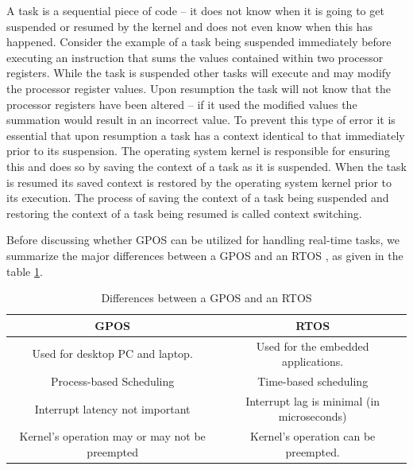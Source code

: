 \documentclass[12pt]{report}
\begin{document}
\begin{itemize}
     A task is a sequential piece of code – it does not know when it is going to get suspended or resumed by the kernel and does not even know when this has happened. Consider the example of a task being suspended immediately before executing an instruction that sums the values contained within two processor registers. While the task is suspended other tasks will execute and may modify the processor register values. Upon resumption the task will not know that the processor registers have been altered – if it used the modified values the summation would result in an incorrect value. To prevent this type of error it is essential that upon resumption a task has a context identical to that immediately prior to its suspension. The operating system kernel is responsible for ensuring this and does so by saving the context of a task as it is suspended. When the task is resumed its saved context is restored by the operating system kernel prior to its execution. The process of saving the context of a task being suspended and restoring the context of a task being resumed is called context switching.
 \end{itemize}

Before discussing whether GPOS can be utilized for handling real-time tasks, we summarize the major differences between a GPOS and an RTOS \cite{rtos-guru}, as given in the table \ref{tab:gpos-rtos}. 
\begin{table}[h]
    \centering
    \begin{tabular}{|c|c|}
        \hline
        \textbf{GPOS} & \textbf{RTOS} \\
        \hline \hline
        Used for desktop PC and laptop. & Used for the embedded applications. \\
        \hline
        Process-based Scheduling &	Time-based scheduling \\
        \hline 
        Interrupt latency not important & Interrupt lag is minimal (in microseconds)\\
        \hline
        Kernel's operation may or may not be preempted &Kernel's operation can be preempted.\\
        \hline
    \end{tabular}
    \caption{Differences between a GPOS and an RTOS}
    \label{tab:gpos-rtos}
\end{table} 
\end{document}
